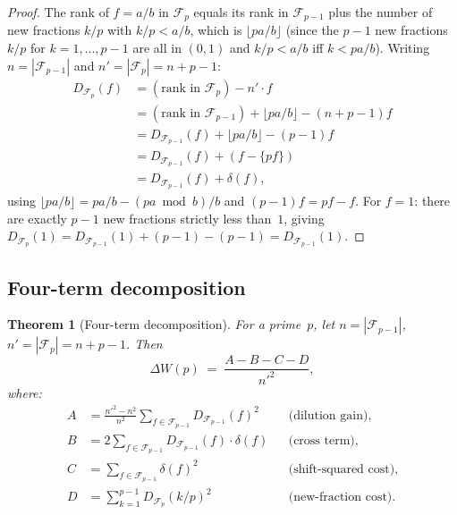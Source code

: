 \documentclass[11pt]{article}
\newtheorem{theorem}{Theorem}[section]
\theoremstyle{definition}
\newcommand{\F}{\mathcal{F}}
\begin{document}
\begin{proof}
The rank of $f = a/b$ in $\F_p$ equals its rank in $\F_{p-1}$ plus
the number of new fractions $k/p$ with $k/p < a/b$, which is
$\lfloor pa/b \rfloor$ (since the $p-1$ new fractions $k/p$ for
$k = 1, \ldots, p-1$ are all in $(0,1)$ and $k/p < a/b$ iff
$k < pa/b$).  Writing $n = |\F_{p-1}|$ and $n' = |\F_p| = n + p - 1$:
\begin{align*}
  D_{\F_p}(f) &= (\text{rank in } \F_p) - n' \cdot f \\
    &= (\text{rank in } \F_{p-1}) + \lfloor pa/b \rfloor - (n + p-1)f \\
    &= D_{\F_{p-1}}(f) + \lfloor pa/b \rfloor - (p-1)f \\
    &= D_{\F_{p-1}}(f) + (f - \{pf\}) \\
    &= D_{\F_{p-1}}(f) + \delta(f),
\end{align*}
using $\lfloor pa/b \rfloor = pa/b - (pa \bmod b)/b$ and
$(p-1)f = pf - f$.  For $f = 1$: there are exactly $p-1$ new
fractions strictly less than~$1$, giving
$D_{\F_p}(1) = D_{\F_{p-1}}(1) + (p-1) - (p-1) = D_{\F_{p-1}}(1)$.
\end{proof}

\subsection{Four-term decomposition}\label{sec:four-term}

\begin{theorem}[Four-term decomposition]\label{thm:four-term}
For a prime~$p$, let $n = |\F_{p-1}|$, $n' = |\F_p| = n + p - 1$.
Then
\begin{equation}\label{eq:four-term}
  \Delta W(p) \;=\; \frac{A - B - C - D}{n'^2},
\end{equation}
where:
\begin{align}
  A &= \frac{n'^2 - n^2}{n^2}\sum_{f \in \F_{p-1}} D_{\F_{p-1}}(f)^2
    & &\text{(dilution gain),} \label{eq:A} \\
  B &= 2 \sum_{f \in \F_{p-1}} D_{\F_{p-1}}(f) \cdot \delta(f)
    & &\text{(cross term),} \label{eq:B} \\
  C &= \sum_{f \in \F_{p-1}} \delta(f)^2
    & &\text{(shift-squared cost),} \label{eq:C} \\
  D &= \sum_{k=1}^{p-1} D_{\F_p}(k/p)^2
    & &\text{(new-fraction cost).} \label{eq:D}
\end{align}
\end{theorem}
\end{document}
